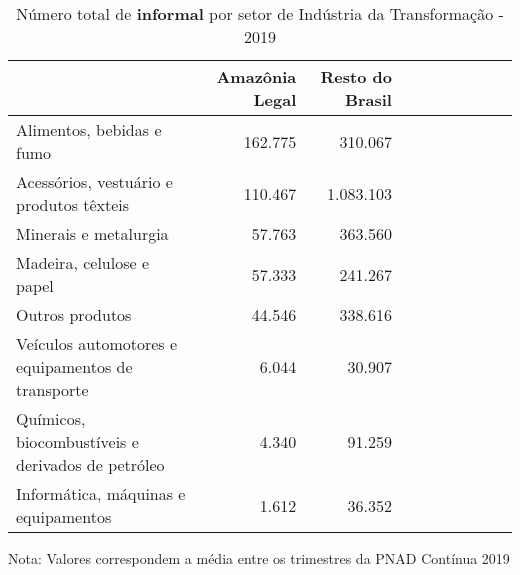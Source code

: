 \begin{table}[H]
\centering
\label{\_retrato\_emprego\_setor\_sgap\_trans\_table\_n\_de\_informal}
\begin{threeparttable}
\caption{Número total de \textbf{informal} por setor de Indústria da Transformação - 2019}
\begin{tabular}{l*{3}{rrr}}
\midrule \midrule
                    &Amazônia Legal&Resto do Brasil\\
\midrule
Alimentos, bebidas e fumo&     162.775&     310.067\\
Acessórios, vestuário e produtos têxteis&     110.467&   1.083.103\\
Minerais e metalurgia&      57.763&     363.560\\
Madeira, celulose e papel&      57.333&     241.267\\
Outros produtos     &      44.546&     338.616\\
Veículos automotores e equipamentos de transporte&       6.044&      30.907\\
Químicos, biocombustíveis e derivados de petróleo&       4.340&      91.259\\
Informática, máquinas e equipamentos&       1.612&      36.352\\
\bottomrule
\end{tabular}
\begin{tablenotes}
\scriptsize{Nota: Valores correspondem a média entre os trimestres da PNAD Contínua 2019}
\end{tablenotes}
\end{threeparttable}
\end{table}
